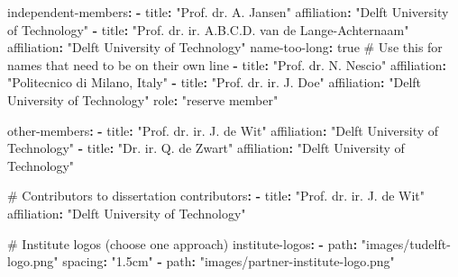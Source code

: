 \documentclass{tudelft}
\newenvironment{Shaded}{\begin{snugshade}}{\end{snugshade}}
\newcommand{\AttributeTok}[1]{\textcolor[rgb]{0.40,0.45,0.13}{#1}}
\newcommand{\CharTok}[1]{\textcolor[rgb]{0.13,0.47,0.30}{#1}}
\newcommand{\CommentTok}[1]{\textcolor[rgb]{0.37,0.37,0.37}{#1}}
\newcommand{\FunctionTok}[1]{\textcolor[rgb]{0.28,0.35,0.67}{#1}}
\newcommand{\KeywordTok}[1]{\textcolor[rgb]{0.00,0.23,0.31}{\textbf{#1}}}
\newcommand{\StringTok}[1]{\textcolor[rgb]{0.13,0.47,0.30}{#1}}
\begin{document}
\begin{Shaded}
\begin{Highlighting}[]
\FunctionTok{independent{-}members}\KeywordTok{:}
\AttributeTok{  }\KeywordTok{{-}}\AttributeTok{ }\FunctionTok{title}\KeywordTok{:}\AttributeTok{ }\StringTok{"Prof. dr. A. Jansen"}
\AttributeTok{    }\FunctionTok{affiliation}\KeywordTok{:}\AttributeTok{ }\StringTok{"Delft University of Technology"}
\AttributeTok{  }\KeywordTok{{-}}\AttributeTok{ }\FunctionTok{title}\KeywordTok{:}\AttributeTok{ }\StringTok{"Prof. dr. ir. A.B.C.D. van de Lange{-}Achternaam"}
\AttributeTok{    }\FunctionTok{affiliation}\KeywordTok{:}\AttributeTok{ }\StringTok{"Delft University of Technology"}
\AttributeTok{    }\FunctionTok{name{-}too{-}long}\KeywordTok{:}\AttributeTok{ }\CharTok{true}\CommentTok{  \# Use this for names that need to be on their own line}
\AttributeTok{  }\KeywordTok{{-}}\AttributeTok{ }\FunctionTok{title}\KeywordTok{:}\AttributeTok{ }\StringTok{"Prof. dr. N. Nescio"}
\AttributeTok{    }\FunctionTok{affiliation}\KeywordTok{:}\AttributeTok{ }\StringTok{"Politecnico di Milano, Italy"}
\AttributeTok{  }\KeywordTok{{-}}\AttributeTok{ }\FunctionTok{title}\KeywordTok{:}\AttributeTok{ }\StringTok{"Prof. dr. ir. J. Doe"}
\AttributeTok{    }\FunctionTok{affiliation}\KeywordTok{:}\AttributeTok{ }\StringTok{"Delft University of Technology"}
\AttributeTok{    }\FunctionTok{role}\KeywordTok{:}\AttributeTok{ }\StringTok{"reserve member"}

\FunctionTok{other{-}members}\KeywordTok{:}
\AttributeTok{  }\KeywordTok{{-}}\AttributeTok{ }\FunctionTok{title}\KeywordTok{:}\AttributeTok{ }\StringTok{"Prof. dr. ir. J. de Wit"}
\AttributeTok{    }\FunctionTok{affiliation}\KeywordTok{:}\AttributeTok{ }\StringTok{"Delft University of Technology"}
\AttributeTok{  }\KeywordTok{{-}}\AttributeTok{ }\FunctionTok{title}\KeywordTok{:}\AttributeTok{ }\StringTok{"Dr. ir. Q. de Zwart"}
\AttributeTok{    }\FunctionTok{affiliation}\KeywordTok{:}\AttributeTok{ }\StringTok{"Delft University of Technology"}

\CommentTok{\# Contributors to dissertation}
\FunctionTok{contributors}\KeywordTok{:}
\AttributeTok{  }\KeywordTok{{-}}\AttributeTok{ }\FunctionTok{title}\KeywordTok{:}\AttributeTok{ }\StringTok{"Prof. dr. ir. J. de Wit"}
\AttributeTok{    }\FunctionTok{affiliation}\KeywordTok{:}\AttributeTok{ }\StringTok{"Delft University of Technology"}

\CommentTok{\# Institute logos (choose one approach)}
\FunctionTok{institute{-}logos}\KeywordTok{:}
\AttributeTok{  }\KeywordTok{{-}}\AttributeTok{ }\FunctionTok{path}\KeywordTok{:}\AttributeTok{ }\StringTok{"images/tudelft{-}logo.png"}
\AttributeTok{    }\FunctionTok{spacing}\KeywordTok{:}\AttributeTok{ }\StringTok{"1.5cm"}
\AttributeTok{  }\KeywordTok{{-}}\AttributeTok{ }\FunctionTok{path}\KeywordTok{:}\AttributeTok{ }\StringTok{"images/partner{-}institute{-}logo.png"}


\end{Highlighting}
\end{Shaded}
\end{document}
